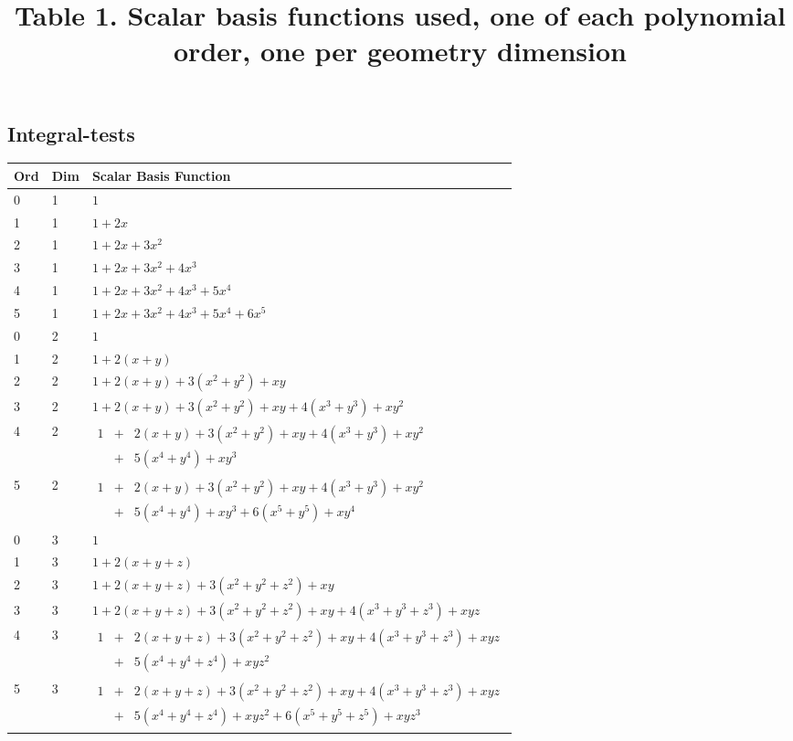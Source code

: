 \documentclass[12pt]{article}
\begin{document}
\subsection{Integral-tests}

\begin{center}
\begin{tabular}{ | l | l | l |}
  \hline
  Ord & Dim & Scalar Basis Function \\ \hline
  0 & 1 & $1$ \\ \hline
  1 & 1 & $1 + 2x$ \\ \hline
  2 & 1 & $1 + 2x + 3x^2$ \\ \hline
  3 & 1 & $1 + 2x + 3x^2 + 4x^3$ \\ \hline
  4 & 1 & $1 + 2x + 3x^2 + 4x^3 + 5x^4$ \\ \hline
  5 & 1 & $1 + 2x + 3x^2 + 4x^3 + 5x^4 + 6x^5$ \\ \hline
  0 & 2 & $1$ \\ \hline
  1 & 2 & $1 + 2(x + y)$ \\ \hline
  2 & 2 & $1 + 2(x + y) + 3(x^2 + y^2) + xy$ \\ \hline
  3 & 2 & $1 + 2(x + y) + 3(x^2 + y^2) + xy + 4(x^3 + y^3) + xy^2$ \\ \hline
  4 & 2 & $\begin{array}{lcl} 1 & + & 2(x + y) + 3(x^2 + y^2) + xy + 4(x^3 + y^3) + xy^2 \\ & + & 5(x^4 + y^4) + xy^3 \end{array}$ \\ \hline
  5 & 2 & $\begin{array}{lcl} 1 & + & 2(x + y) + 3(x^2 + y^2) + xy + 4(x^3 + y^3) + xy^2 \\ & + & 5(x^4 + y^4) + xy^3 + 6(x^5 + y^5) + xy^4 \end{array}$ \\ \hline
  0 & 3 & $1$ \\ \hline
  1 & 3 & $1 + 2(x + y + z)$ \\ \hline
  2 & 3 & $1 + 2(x + y + z) + 3(x^2 + y^2 + z^2) + xy$ \\ \hline
  3 & 3 & $1 + 2(x + y + z) + 3(x^2 + y^2 + z^2) + xy + 4(x^3 + y^3 + z^3) + xyz$ \\ \hline
  4 & 3 & $\begin{array}{lcl} 1 & + & 2(x + y + z) + 3(x^2 + y^2 + z^2) + xy + 4(x^3 + y^3 + z^3) + xyz \\ & + & 5(x^4 + y^4 + z^4) + xyz^2 \end{array}$ \\ \hline
  5 & 3 & $\begin{array}{lcl} 1 & + & 2(x + y + z) + 3(x^2 + y^2 + z^2) + xy + 4(x^3 + y^3 + z^3) + xyz \\ & + & 5(x^4 + y^4 + z^4) + xyz^2 + 6(x^5 + y^5 + z^5) + xyz^3 \end{array}$ \\ \hline
\end{tabular}
\vfill
\title{Table 1. Scalar basis functions used, one of each polynomial order, one per geometry dimension}
\end{center}
\end{document}
